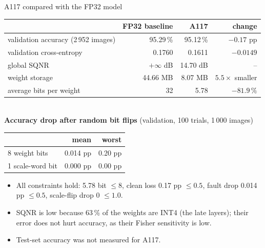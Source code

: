 \documentclass[aspectratio=169,10pt]{beamer}
\begin{document}
\begin{frame}{A117 compared with the FP32 model}
  \small
  \begin{tabular}{@{}lrrr@{}}
    \toprule
    & FP32 baseline & A117 & change\\
    \midrule
    validation accuracy (2\,952 images) & 95.29\,\% & 95.12\,\% & $-0.17$ pp\\
    validation cross-entropy & 0.1760 & 0.1611 & $-0.0149$\\
    global SQNR & $+\infty$ dB & 14.70 dB & --\\
    weight storage & 44.66 MB & 8.07 MB & $5.5\times$ smaller\\
    average bits per weight & 32 & 5.78 & $-81.9\,\%$\\
    \bottomrule
  \end{tabular}\\[3mm]
  \textbf{Accuracy drop after random bit flips} (validation, 100 trials, 1\,000 images)\\[1mm]
  \begin{tabular}{@{}lrr@{}}
    \toprule
    & mean & worst\\
    \midrule
    8 weight bits & 0.014 pp & 0.20 pp\\
    1 scale-word bit & 0.000 pp & 0.00 pp\\
    \bottomrule
  \end{tabular}
  \begin{itemize}\footnotesize
    \item All constraints hold: 5.78 bit $\le 8$, clean loss 0.17 pp $\le 0.5$, fault drop 0.014 pp $\le 0.5$, scale-flip drop 0 $\le 1.0$.
    \item SQNR is low because 63\,\% of the weights are INT4 (the late layers); their error does not hurt accuracy, as their Fisher sensitivity is low.
    \item Test-set accuracy was not measured for A117.
  \end{itemize}
\end{frame}
\end{document}
